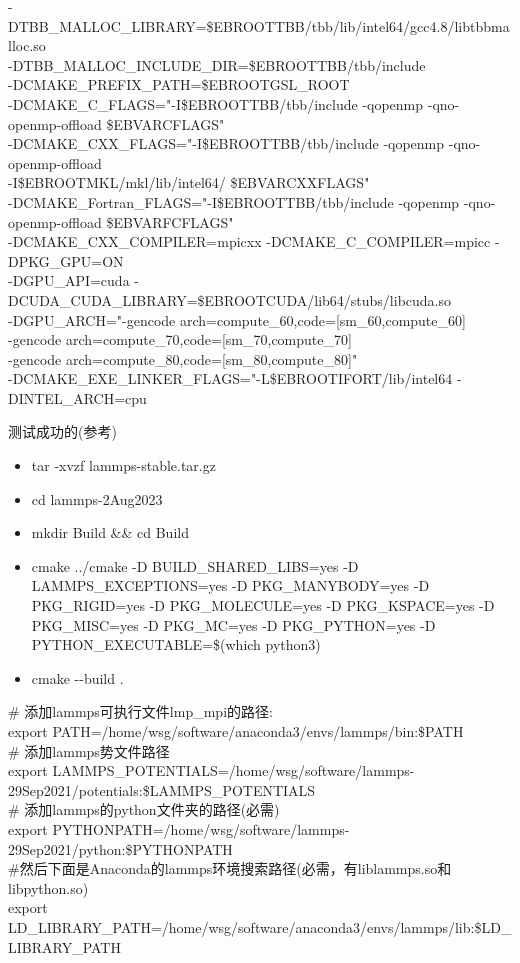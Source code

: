 \documentclass[10pt,a4paper]{article}
\begin{document}
-DTBB\_MALLOC\_LIBRARY=\$EBROOTTBB/tbb/lib/intel64/gcc4.8/libtbbmalloc.so \\
-DTBB\_MALLOC\_INCLUDE\_DIR=\$EBROOTTBB/tbb/include \\
-DCMAKE\_PREFIX\_PATH=\$EBROOTGSL\_ROOT \\
-DCMAKE\_C\_FLAGS="-I\$EBROOTTBB/tbb/include -qopenmp -qno-openmp-offload \$EBVARCFLAGS" \\
-DCMAKE\_CXX\_FLAGS="-I\$EBROOTTBB/tbb/include -qopenmp -qno-openmp-offload \\
-I\$EBROOTMKL/mkl/lib/intel64/ \$EBVARCXXFLAGS" \\
-DCMAKE\_Fortran\_FLAGS="-I\$EBROOTTBB/tbb/include -qopenmp -qno-openmp-offload \$EBVARFCFLAGS" \\
-DCMAKE\_CXX\_COMPILER=mpicxx -DCMAKE\_C\_COMPILER=mpicc -DPKG\_GPU=ON \\
-DGPU\_API=cuda -DCUDA\_CUDA\_LIBRARY=\$EBROOTCUDA/lib64/stubs/libcuda.so \\
-DGPU\_ARCH="-gencode arch=compute\_60,code=[sm\_60,compute\_60] \\
-gencode arch=compute\_70,code=[sm\_70,compute\_70] \\
-gencode arch=compute\_80,code=[sm\_80,compute\_80]" \\
-DCMAKE\_EXE\_LINKER\_FLAGS="-L\$EBROOTIFORT/lib/intel64 -DINTEL\_ARCH=cpu

测试成功的(参考)
\begin{itemize}
	\item \textrm{tar -xvzf lammps-stable.tar.gz}
	\item \textrm{cd lammps-2Aug2023}
	\item \textrm{mkdir Build \&\& cd Build}
	\item \textrm{cmake ../cmake -D BUILD\_SHARED\_LIBS=yes -D LAMMPS\_EXCEPTIONS=yes  -D PKG\_MANYBODY=yes -D PKG\_RIGID=yes -D PKG\_MOLECULE=yes -D PKG\_KSPACE=yes -D PKG\_MISC=yes -D PKG\_MC=yes  -D PKG\_PYTHON=yes -D PYTHON\_EXECUTABLE=\$(which python3)}
	\item \textrm{cmake -\/-build .}
\end{itemize}

\# 添加\textrm{lammps}可执行文件\textrm{lmp_mpi}的路径:\\
\textrm{export PATH=/home/wsg/software/anaconda3/envs/lammps/bin:\$PATH}\\
\# 添加\textrm{lammps}势文件路径\\
\textrm{export LAMMPS\_POTENTIALS=/home/wsg/software/lammps-29Sep2021/potentials:\$LAMMPS\_POTENTIALS}\\
\# 添加\textrm{lammps}的\textrm{python}文件夹的路径(必需)\\
\textrm{export PYTHONPATH=/home/wsg/software/lammps-29Sep2021/python:\$PYTHONPATH}\\
\#然后下面是\textrm{Anaconda}的\textrm{lammps}环境搜索路径(必需，有\textrm{liblammps.so}和\textrm{libpython.so})\\
\textrm{export LD\_LIBRARY\_PATH=/home/wsg/software/anaconda3/envs/lammps/lib:\$LD\_LIBRARY\_PATH}
\end{document}
